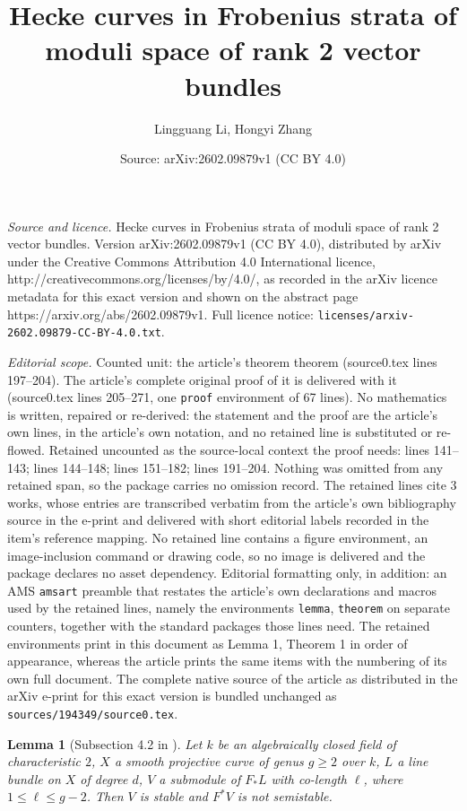 \documentclass[10pt,a4paper]{amsart}
\title{Hecke curves in Frobenius strata of moduli space of rank 2 vector bundles}
\author{Lingguang Li, Hongyi Zhang}
\date{Source: arXiv:2602.09879v1 (CC BY 4.0)}
\newtheorem{lemma}{Lemma}
\begin{document}
\maketitle

\noindent\emph{Source and licence.} Hecke curves in Frobenius strata of moduli space of rank 2 vector bundles. Version arXiv:2602.09879v1 (CC BY 4.0), distributed by arXiv under the Creative Commons Attribution 4.0 International licence, http://creativecommons.org/licenses/by/4.0/, as recorded in the arXiv licence metadata for this exact version and shown on the abstract page https://arxiv.org/abs/2602.09879v1. Full licence notice: \texttt{licenses/arxiv-2602.09879-CC-BY-4.0.txt}.\par\smallskip

\noindent\textit{Editorial scope.} Counted unit: the article's theorem theorem (source0.tex lines 197--204). The article's complete original proof of it is delivered with it (source0.tex lines 205--271, one \texttt{proof} environment of 67 lines). No mathematics is written, repaired or re-derived: the statement and the proof are the article's own lines, in the article's own notation, and no retained line is substituted or re-flowed.  Retained uncounted as the source-local context the proof needs: lines 141--143; lines 144--148; lines 151--182; lines 191--204.  Nothing was omitted from any retained span, so the package carries no omission record.  The retained lines cite 3 works, whose entries are transcribed verbatim from the article's own bibliography source in the e-print and delivered with short editorial labels recorded in the item's reference mapping.  No retained line contains a figure environment, an image-inclusion command or drawing code, so no image is delivered and the package declares no asset dependency.  Editorial formatting only, in addition: an AMS \texttt{amsart} preamble that restates the article's own declarations and macros used by the retained lines, namely the environments \texttt{lemma}, \texttt{theorem} on separate counters, together with the standard packages those lines need.  The retained environments print in this document as Lemma 1, Theorem 1 in order of appearance, whereas the article prints the same items with the numbering of its own full document.  The complete native source of the article as distributed in the arXiv e-print for this exact version is bundled unchanged as \texttt{sources/194349/source0.tex}.
\begin{lemma}[Subsection 4.2 in \cite{JRXY06}]\label{lemma3}
    Let $k$ be an algebraically closed field of characteristic $2$, $X$ a smooth projective curve of genus $g\geqslant 2$ over $k$, $L$ a line bundle on $X$ of degree $d$, $V$ a submodule of $F_*L$ with co-length $\ell$, where $1 \leqslant \ell \leqslant g-2$. Then $V$ is stable and $F^*V$ is not semistable.
\end{lemma}
\end{document}
